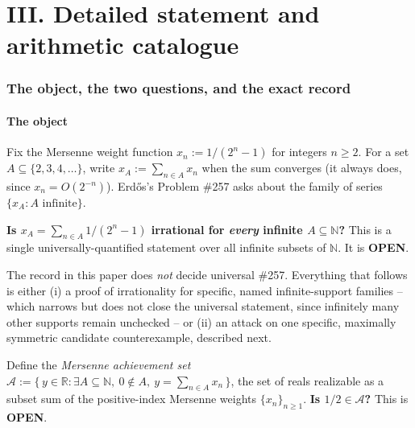 \clearpage
\part*{III. Detailed statement and arithmetic catalogue}
\section{The object, the two questions, and the exact record}

\subsection{The object}

Fix the Mersenne weight function $x_n := 1/(2^n-1)$ for integers $n \ge 2$. For a set
$A \subseteq \{2,3,4,\dots\}$, write $x_A := \sum_{n \in A} x_n$ when the sum converges (it always
does, since $x_n = O(2^{-n})$). Erd\H{o}s's Problem \#257 asks about the family of series
$\{x_A : A \text{ infinite}\}$.

\begin{defn}
\textbf{Is $x_A = \sum_{n \in A} 1/(2^n-1)$ irrational for \emph{every} infinite
$A \subseteq \mathbb{N}$?}
This is a single universally-quantified statement over all infinite subsets of $\mathbb{N}$. It is
\textbf{OPEN}. 
\end{defn}

The record in this paper does \emph{not} decide universal \#257. Everything that follows is either
(i) a proof of irrationality for specific, named infinite-support families -- which narrows but
does not close the universal statement, since infinitely many other supports remain unchecked -- or
(ii) an attack on one specific, maximally symmetric candidate counterexample, described next.

\begin{defn}
\label{defn:half-question}
Define the \emph{Mersenne achievement set}
$\mathcal{A} := \{\,y \in \mathbb{R} : \exists A \subseteq \mathbb{N},\ 0 \notin A,\ y =
\sum_{n \in A} x_n\,\}$, the set of reals realizable as a subset sum of the positive-index Mersenne
weights $\{x_n\}_{n \ge 1}$. \textbf{Is $1/2 \in \mathcal{A}$?} This is \textbf{OPEN}. 
\end{defn}

